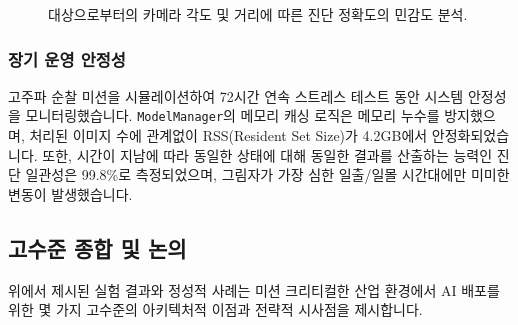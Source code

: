 \begin{figure}[h]
\centering
\fbox{\rule{0pt}{1.5in} \rule{0.8\linewidth}{0pt}} %
\caption{대상으로부터의 카메라 각도 및 거리에 따른 진단 정확도의 민감도 분석.}
\label{fig:sensitivity}
\end{figure}

\subsubsection{장기 운영 안정성}
고주파 순찰 미션을 시뮬레이션하여 72시간 연속 스트레스 테스트 동안 시스템 안정성을 모니터링했습니다.
\texttt{ModelManager}의 메모리 캐싱 로직은 메모리 누수를 방지했으며, 처리된 이미지 수에 관계없이 RSS(Resident Set Size)가 4.2GB에서 안정화되었습니다.
또한, 시간이 지남에 따라 동일한 상태에 대해 동일한 결과를 산출하는 능력인 진단 일관성은 99.8\%로 측정되었으며, 그림자가 가장 심한 일출/일몰 시간대에만 미미한 변동이 발생했습니다.

\subsection{고수준 종합 및 논의}
위에서 제시된 실험 결과와 정성적 사례는 미션 크리티컬한 산업 환경에서 AI 배포를 위한 몇 가지 고수준의 아키텍처적 이점과 전략적 시사점을 제시합니다.

